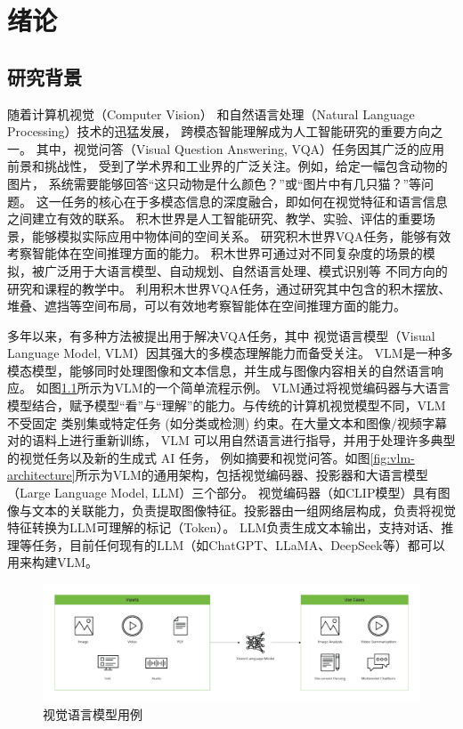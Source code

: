 \chapter{绪论}
\section{研究背景}
随着计算机视觉（Computer Vision）
和自然语言处理（Natural Language Processing）技术的迅猛发展，
跨模态智能理解成为人工智能研究的重要方向之一。
其中，视觉问答（Visual Question Answering, VQA）\cite{goyal2017making}任务因其广泛的应用前景和挑战性，
受到了学术界和工业界的广泛关注。例如，给定一幅包含动物的图片，
系统需要能够回答“这只动物是什么颜色？”或“图片中有几只猫？”等问题。
这一任务的核心在于多模态信息的深度融合，即如何在视觉特征和语言信息之间建立有效的联系。
积木世界\cite{hogg1983block}是人工智能研究、教学、实验、评估的重要场景，能够模拟实际应用中物体间的空间关系。
研究积木世界VQA任务，能够有效考察智能体在空间推理方面的能力。
积木世界可通过对不同复杂度的场景的模拟，被广泛用于大语言模型、自动规划、自然语言处理、模式识别等
不同方向的研究和课程的教学中\cite{chiyahgarcia2024repairsblockworldnew}\cite{silver2023generalizedplanningpddldomains}。
利用积木世界VQA任务，通过研究其中包含的积木摆放、堆叠、遮挡等空间布局，可以有效地考察智能体在空间推理方面的能力\cite{johnson2017clevr}。

多年以来，有多种方法被提出用于解决VQA任务，其中
视觉语言模型（Visual Language Model, VLM）因其强大的多模态理解能力而备受关注。
VLM是一种多模态模型，能够同时处理图像和文本信息，并生成与图像内容相关的自然语言响应。
如图\ref{fig:vlm-example}所示为VLM的一个简单流程示例。
VLM通过将视觉编码器与大语言模型结合，赋予模型“看”与“理解”的能力。与传统的计算机视觉模型不同，VLM 不受固定
类别集或特定任务 (如分类或检测) 约束。在大量文本和图像/视频字幕对的语料上进行重新训练，
VLM 可以用自然语言进行指导，并用于处理许多典型的视觉任务以及新的生成式 AI 任务，
例如摘要和视觉问答。如图\ref{fig:vlm-architecture}所示为VLM的通用架构，包括视觉编码器、投影器和大语言模型（Large Language Model, LLM）三个部分。
视觉编码器（如CLIP模型）具有图像与文本的关联能力，负责提取图像特征。投影器由一组网络层构成，负责将视觉特征转换为LLM可理解的标记（Token）。
LLM负责生成文本输出，支持对话、推理等任务，目前任何现有的LLM（如ChatGPT、LLaMA、DeepSeek等）都可以用来构建VLM。
\begin{figure}
    \centering
    \includegraphics[width=\textwidth]{figures/VLM-example.png}
    \caption{视觉语言模型用例}
    \label{fig:vlm-example}
\end{figure}

